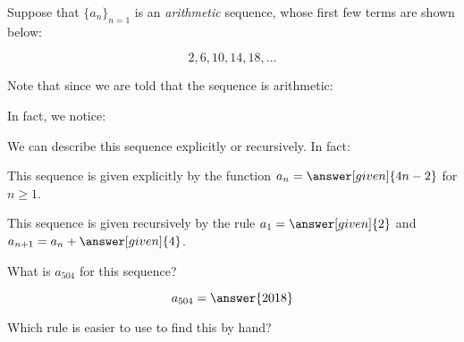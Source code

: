 \documentclass{ximera}
\author{Jim Talamo and Bart Snapp}
\begin{document}
\begin{exercise}

Suppose that $\{a_n\}_{n=1}$ is an \emph{arithmetic} sequence, whose first few terms are shown below:

\[
2, 6, 10, 14, 18, \ldots
\]

Note that since we are told that the sequence is arithmetic:

\begin{multipleChoice}
\end{multipleChoice}

\begin{exercise}
In fact, we notice:
  \begin{image}
  \end{image}
  
  We can describe this sequence explicitly or recursively. In fact:
  
  This sequence is given explicitly by the function $a_n=\answer[given]{4n - 2}$ for $n \geq 1$.
  
  This sequence is given recursively by the rule $a_1 = \answer[given]{2}$ and $a_{n+1} = a_n +
  \answer[given]{4}$. 

\begin{exercise}
What is $a_{504}$ for this sequence?

\[
a_{504}=\answer{2018}
\]

Which rule is easier to use to find this by hand?

\end{exercise}
  
\end{exercise}
\end{exercise}
\end{document}
